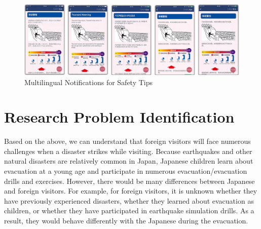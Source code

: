 \begin{figure}[h]
  \includegraphics[width=\linewidth]{Figure/Figure4.png}
  \centering
  \caption[Multilingual Notifications for Safety Tips]{Multilingual Notifications for Safety Tips\protect\footnotemark }
  \label{fig4}
\end{figure}

\section{Research Problem Identification}
Based on the above, we can understand that foreign visitors will face numerous challenges when a disaster strikes while visiting. Because earthquakes and other natural disasters are relatively common in Japan, Japanese children learn about evacuation at a young age and participate in numerous evacuation/evacuation drills and exercises. However, there would be many differences between Japanese and foreign visitors. For example, for foreign visitors, it is unknown whether they have previously experienced disasters, whether they learned about evacuation as children, or whether they have participated in earthquake simulation drills. As a result, they would behave differently with the Japanese during the evacuation. 

